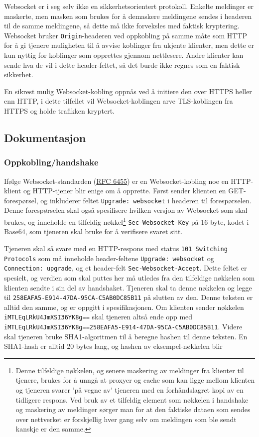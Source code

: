 \documentclass{article}
\newcommand{\code}[1]{\colorbox{light-gray}{\texttt{#1}}}
\begin{document}
Websocket er i seg selv ikke en sikkerhetsorientert protokoll. Enkelte meldinger er maskerte, men masken som brukes for å demaskere meldingene sendes i headeren til de samme meldingene, så dette må ikke forveksles med faktisk kryptering. Websocket bruker \texttt{Origin}-headeren ved oppkobling på samme måte som HTTP for å gi tjenere muligheten til å avvise koblinger fra ukjente klienter, men dette er kun nyttig for koblinger som opprettes gjennom nettlesere. Andre klienter kan sende hva de vil i dette header-feltet, så det burde ikke regnes som en faktisk sikkerhet.

En sikrest mulig Websocket-kobling oppnås ved å initiere den over HTTPS heller enn HTTP, i dette tilfellet vil Websocket-koblingen arve TLS-koblingen fra HTTPS og holde trafikken kryptert.

\subsection{Dokumentasjon}
\subsubsection{Oppkobling/handshake}

Ifølge Websocket-standarden (\href{https://www.rfc-editor.org/rfc/rfc6455.html}{RFC 6455}) er en Websocket-kobling noe en HTTP-klient og HTTP-tjener blir enige om å opprette. Først sender klienten en GET-forespørsel, og inkluderer feltet \code{Upgrade: websocket} i headeren til forespørselen. Denne forespørselen skal også spesifisere hvilken versjon av Websocket som skal brukes, og inneholde en tilfeldig nøkkel\footnote{Denne tilfeldige nøkkelen, og senere maskering av meldinger fra klienter til tjenere, brukes for å unngå at proxyer og cache som kan ligge mellom klienten og tjeneren svarer 'på vegne av' tjeneren med en forhåndslagret kopi av en tidligere respons. Ved bruk av et tilfeldig element som nøkkelen i handshake og maskering av meldinger sørger man for at den faktiske dataen som sendes over nettverket er forskjellig hver gang selv om meldingen som ble sendt kanskje er den samme.} \code{Sec-Websocket-Key} på 16 byte, kodet i Base64, som tjeneren skal bruke for å verifisere svaret sitt.

Tjeneren skal så svare med en HTTP-respons med status \code{101 Switching Protocols} som må inneholde header-feltene \code{Upgrade: websocket} og \code{Connection: upgrade}, og et header-felt \code{Sec-Websocket-Accept}. Dette feltet er spesielt, og verdien som skal puttes her må utledes fra den tilfeldige nøkkelen som klienten sendte i sin del av handshaket. Tjeneren skal ta denne nøkkelen og legge til \code{258EAFA5-E914-47DA-95CA-C5AB0DC85B11} på slutten av den. Denne teksten er alltid den samme, og er oppgitt i spesifikasjonen. Om klienten sender nøkkelen \code{iMTLEqLRkU4JmXSI36YK8g==} skal tjeneren altså ende opp med \code{iMTLEqLRkU4JmXSI36YK8g==258EAFA5-E914-47DA-95CA-C5AB0DC85B11}. Videre skal tjeneren bruke SHA1-algoritmen til å beregne hashen til denne teksten. En SHA1-hash er alltid 20 bytes lang, og hashen av eksempel-nøkkelen blir
\end{document}
